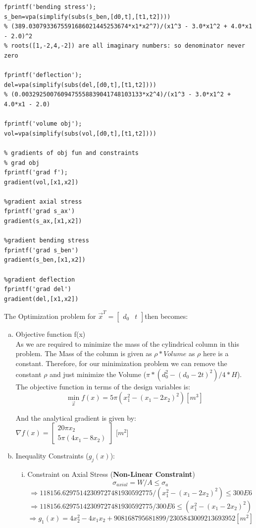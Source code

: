 \documentclass[12pt]{article}
\begin{document}
\begin{enumerate}[I]
\begin{enumerate}[1)]
\begin{lstlisting}
fprintf('bending stress');
s_ben=vpa(simplify(subs(s_ben,[d0,t],[t1,t2])))
% (389.0307933675591686021445253674*x1*x2^7)/(x1^3 - 3.0*x1^2 + 4.0*x1 - 2.0)^2
% roots([1,-2,4,-2]) are all imaginary numbers: so denominator never zero

fprintf('deflection');
del=vpa(simplify(subs(del,[d0,t],[t1,t2])))
% (0.0032925007609475558839041748103133*x2^4)/(x1^3 - 3.0*x1^2 + 4.0*x1 - 2.0)

fprintf('volume obj');
vol=vpa(simplify(subs(vol,[d0,t],[t1,t2])))

% gradients of obj fun and constraints
% grad obj
fprintf('grad f');
gradient(vol,[x1,x2])

%gradient axial stress
fprintf('grad s_ax')
gradient(s_ax,[x1,x2])

%gradient bending stress
fprintf('grad s_ben')
gradient(s_ben,[x1,x2])

%gradient deflection
fprintf('grad del')
gradient(del,[x1,x2])
    \end{lstlisting}
    
    The Optimization problem for $\vec{x}^T=\begin{bmatrix}d_0 & t\end{bmatrix}$then becomes:\\
    \begin{enumerate}[a)]
        \item Objective function f(x)\\
        As we are required to minimize the mass of the cylindrical column in this problem. The Mass of the column is given as $\rho*Volume$ as $\rho$ here is a constant. Therefore, for our minimization problem we can remove the constant $\rho$ and just minimize the Volume ($\pi*(d_0^2-(d_0-2t)^2)/4*H$). The objective function in terms of the design variables is:\\
    $$\min_{\vec{x}} f(x)= 5\pi(x_1^2 - (x_1 - 2x_2)^2) [m^3]$$
    
    And the analytical gradient is given by:\\
$\nabla f(x) = \begin{bmatrix} 20\pi x_2\\ 5\pi(4x_1 - 8x_2) \end{bmatrix}$ [$m^2$]\\
    
        \item Inequality Constraints ($g_j(x)$):
        \begin{enumerate}[i)]
            \item Constraint on Axial Stress (\textbf{Non-Linear Constraint}) \\
$$\sigma_{axial}=W/A\leq \sigma_a $$
$$\Rightarrow118156.62975142309727481930592775/(x_1^2-(x_1 - 2x_2)^2)\leq300E6$$
$$\Rightarrow118156.62975142309727481930592775/300E6 \leq(x_1^2-(x_1 - 2x_2)^2)$$
$$\Rightarrow g_1(x)=4x_2^2 - 4x_1x_2 + 908168795681899/2305843009213693952 [m^2]$$


\end{enumerate}
\end{enumerate}
\end{enumerate}
\end{enumerate}
\end{document}
